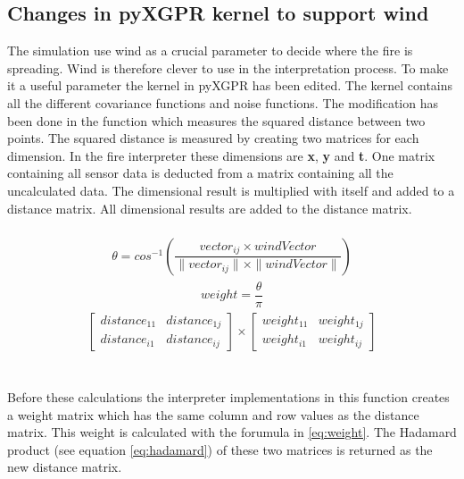 \subsection{Changes in pyXGPR kernel to support wind}
The simulation use wind as a crucial parameter to decide where the fire is spreading. Wind is therefore clever to use in the interpretation process. To make it a useful parameter the kernel in pyXGPR has been edited. The kernel contains all the different covariance functions and noise functions. The modification has been done in the function which measures the squared distance between two points. The squared distance is measured by creating two matrices for each dimension. In the fire interpreter these dimensions are \textbf{x}, \textbf{y} and \textbf{t}. One matrix containing all sensor data is deducted from a matrix containing all the uncalculated data. The dimensional result is multiplied with itself and added to a distance matrix. All dimensional results are added to the distance matrix. 
\\\\
\begin{eqnarray}
\theta = cos^{-1}\left(\dfrac{vector_{ij} \times windVector}{\|vector_{ij}\| \times \|windVector\| } \right) 
\label{eq:int-angle}
\end{eqnarray}
\begin{eqnarray}
weight = \dfrac{\theta}{\pi}
\label{eq:weight}
\end{eqnarray}
\begin{eqnarray}
\begin{bmatrix} distance_{11} & distance_{1j} \\ distance_{i1} & distance_{ij} \end{bmatrix} \times 
\begin{bmatrix} weight_{11} & weight_{1j} \\ weight_{i1} & weight_{ij} \end{bmatrix}
\label{eq:hadamard}
\end{eqnarray}
\\\\
Before these calculations the interpreter implementations in this function creates a weight matrix which has the same column and row values as the distance matrix. This weight is calculated with the forumula in \ref{eq:weight}. The Hadamard\cite{hadamard} product (see equation \ref{eq:hadamard}) of these two matrices is returned as the new distance matrix. 
\\\\
